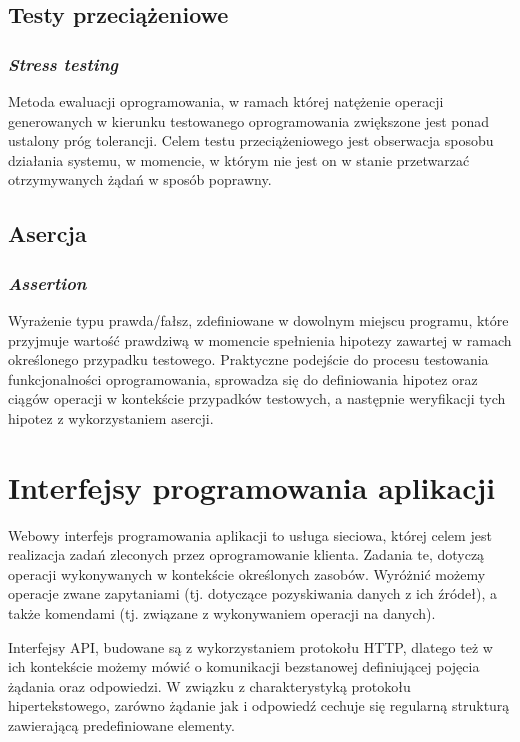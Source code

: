 \subsection*{Testy przeciążeniowe}
\subsubsection{\textit{Stress testing}}
Metoda ewaluacji oprogramowania, w ramach której natężenie operacji generowanych w kierunku testowanego oprogramowania zwiększone jest ponad ustalony próg tolerancji. Celem testu przeciążeniowego jest obserwacja sposobu działania systemu, w momencie, w którym nie jest on w stanie przetwarzać otrzymywanych żądań w sposób poprawny.

\subsection*{Asercja}
\subsubsection{\textit{Assertion}}
Wyrażenie typu prawda/fałsz, zdefiniowane w dowolnym miejscu programu, które przyjmuje wartość prawdziwą w momencie spełnienia hipotezy zawartej w ramach określonego przypadku testowego. Praktyczne podejście do procesu testowania funkcjonalności oprogramowania, sprowadza się do definiowania hipotez oraz ciągów operacji w kontekście przypadków testowych, a następnie weryfikacji tych hipotez z wykorzystaniem asercji.

\section{Interfejsy programowania aplikacji}
Webowy interfejs programowania aplikacji to usługa sieciowa, której celem jest realizacja zadań zleconych przez oprogramowanie klienta. Zadania te, dotyczą operacji wykonywanych w kontekście określonych zasobów. Wyróżnić możemy operacje zwane zapytaniami (tj. dotyczące pozyskiwania danych z ich źródeł), a także komendami (tj. związane z wykonywaniem operacji na danych).

Interfejsy API, budowane są z wykorzystaniem protokołu HTTP, dlatego też w ich kontekście możemy mówić o komunikacji bezstanowej definiującej pojęcia żądania oraz odpowiedzi. W związku z charakterystyką protokołu hipertekstowego, zarówno żądanie jak i odpowiedź cechuje się regularną strukturą zawierającą predefiniowane elementy.

